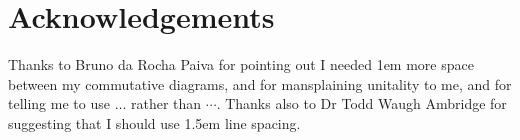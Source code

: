 \chapter{Acknowledgements}\label{chap:acknowledgements}

Thanks to Bruno da Rocha Paiva for pointing out I needed 1em more space between
my commutative diagrams, and for mansplaining unitality to me, and for telling
me to use \(\dots\) rather than \(\cdots\).
Thanks also to Dr Todd Waugh Ambridge for suggesting that I should use 1.5em
line spacing.

